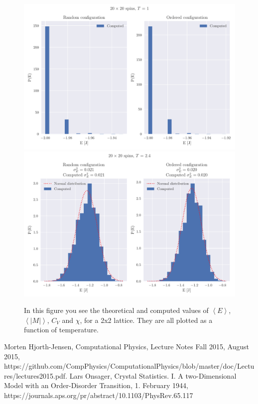 \documentclass[reprint, english,notitlepage,nofootinbib]{revtex4-1}  %
\begin{document}
\begin{figure}[!htb]
	\includegraphics[width=16cm]{../output/de/L20-T1-dT0_0-NT1-N5-ProbE.pdf}
	\includegraphics[width=16cm]{../output/de/L20-T2_4-dT0_0-NT1-N5-ProbE.pdf}
	\caption{In this figure you see the theoretical and computed values of $\left<E\right>$, $\left<|M|\right>$, $C_V$ and $\chi$, for a 2x2 lattice. They are all plotted as a function of temperature.}
	\label{fig:L20_prob_dist}
\end{figure}


\onecolumngrid
\vspace{1cm} %

\begin{thebibliography}{}
 Morten Hjorth-Jensen, Computational Physics, Lecture Notes Fall 2015, August 2015, https://github.com/CompPhysics/ComputationalPhysics/blob/master/doc/Lectures/lectures2015.pdf.
 Lars Onsager, Crystal Statistics. I. A two-Dimensional Model with an Order-Disorder Transition, 1. February 1944, https://journals.aps.org/pr/abstract/10.1103/PhysRev.65.117

\end{thebibliography}
\end{document}
